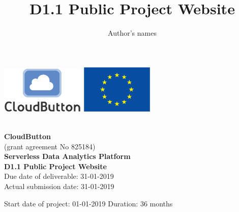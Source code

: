 \documentclass[a4paper,11pt]{article}
\title{D1.1 Public Project Website}
\author{Author's names}
\numberwithin{table}{subsection} %
\begin{document}
\clearpage\setcounter{page}{1}\pagestyle{empty}



\begin{center}
	\begin{center}
		\includegraphics[width=4cm]{figures/cloudbutton_logo.eps}
		\hfill
		\includegraphics[width=3.5cm]{figures/eu_flag_eps.eps}
	\end{center}
\vspace*{1.3cm}
 \\
\vspace*{0.6cm}
\noindent \Huge \textbf{CloudButton} \\
\vspace*{0.3cm}
\noindent \normalsize (grant agreement No 825184) \\
\vspace*{0.8cm}
\noindent \LARGE \textbf{Serverless Data Analytics Platform}\\
\vspace*{4.0cm}
\noindent \LARGE \textbf{D1.1 Public Project Website} \\
\vspace*{5.0cm}
\noindent \large Due date of deliverable: 31-01-2019 \\
\noindent \large Actual submission date: 31-01-2019\\
\vspace*{3.0cm}

Start date of project: 01-01-2019
\hfill
Duration: 36 months\\

\end{center}




\newpage\pagestyle{empty}
\end{document}
